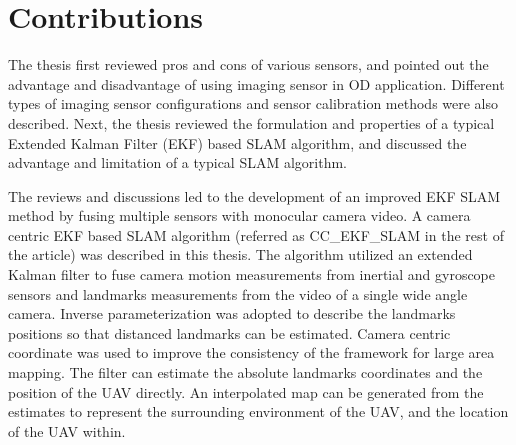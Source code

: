 \section{Contributions}\label{section:Contribution}
The thesis first reviewed pros and cons of various sensors, and
pointed out the advantage and disadvantage of using imaging sensor in
OD application. Different types of imaging sensor configurations and
sensor calibration methods were also described. Next, the thesis
reviewed the formulation and properties of a typical Extended Kalman
Filter (EKF) based SLAM algorithm, and discussed the advantage and
limitation of a typical SLAM algorithm.

The reviews and discussions led to the development of an improved EKF
SLAM method by fusing multiple sensors with monocular camera video.
A camera centric EKF based SLAM algorithm (referred as CC\_EKF\_SLAM
in the rest of the article) was described in this thesis. The
algorithm utilized an extended Kalman filter to fuse camera motion
measurements from inertial and gyroscope sensors and landmarks
measurements from the video of a single wide angle camera. Inverse
parameterization was adopted to describe the landmarks positions so
that distanced landmarks can be estimated. Camera centric coordinate
was used to improve the consistency of the framework for large area
mapping. The filter can estimate the absolute landmarks coordinates and
the position of the UAV directly. An interpolated map can be generated
from the estimates to represent the surrounding environment of the
UAV, and the location of the UAV within.

